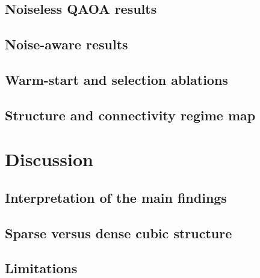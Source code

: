 \documentclass[a4paper,onecolumn,11pt,unpublished]{quantumarticle}
\newcommand{\blankcontent}{\noindent\mbox{}\par}
\theoremstyle{remark}
\begin{document}
\subsection{Noiseless QAOA results}
\blankcontent

\subsection{Noise-aware results}
\blankcontent

\subsection{Warm-start and selection ablations}
\label{sec:results-warmstart-correction}



\subsection{Structure and connectivity regime map}
\blankcontent

\section{Discussion}
\label{sec:discussion}

\subsection{Interpretation of the main findings}


\subsection{Sparse versus dense cubic structure}

\subsection{Limitations}
\end{document}

